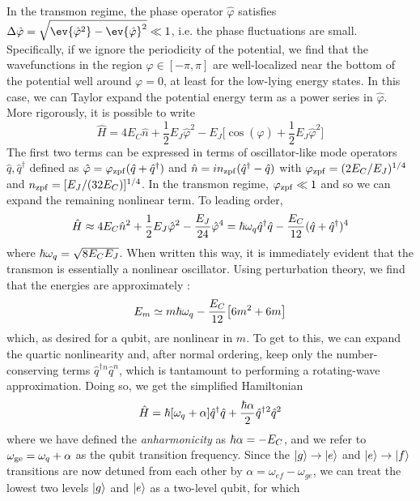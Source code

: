 In the transmon regime, the phase operator $\hat{\varphi}$ satisfies $\Delta\hat{\varphi} = \sqrt{\ev{\hat{\varphi}^2} - \ev{\hat{\varphi}}^2} \ll 1$, i.e. the phase fluctuations are small. Specifically, if we ignore the periodicity of the potential, we find that the wavefunctions in the region $\varphi \in [-\pi, \pi]$ are well-localized near the bottom of the potential well around $\varphi = 0$, at least for the low-lying energy states. In this case, we can Taylor expand the potential energy term as a power series in $\hat{\varphi}$. More rigorously, it is possible to write  
\begin{equation}
    \hat{H} = 4E_C\hat{n} + \frac{1}{2}E_J \hat{\varphi}^2 - E_J\bigg[\cos(\hat{\varphi}) + \frac{1}{2}E_J \hat{\varphi}^2\bigg]
\end{equation}
The first two terms can be expressed in terms of oscillator-like mode operators $\hat{q}, \hat{q}^\dagger$ defined as $\hat{\varphi} = \varphi_{\rm zpf}(\hat{q} + \hat{q}^\dagger)$ and $\hat{n} = in_{\rm zpf}(\hat{q}^\dagger - \hat{q})$ with $\varphi_{\rm zpf} = (2E_C/E_J)^{1/4}$ and $n_{\rm zpf} =  [E_J/(32E_C)]^{1/4}$. In the transmon regime, $\varphi_{\rm zpf} \ll 1$ and so we can expand the remaining nonlinear term. To leading order,
\begin{equation}
    \hat{H} \approx 4E_C\hat{n}^2 + \frac{1}{2}E_J \hat{\varphi}^2 - \frac{E_J}{24}\hat{\varphi}^4 = \hbar\omega_q \hat{q}^\dagger \hat{q} - \frac{E_C}{12}(\hat{q} + \hat{q}^\dagger)^4
    \label{eq:transmon_duffing_H}
\end{equation}
where $\hbar\omega_q = \sqrt{8 E_C E_J}$. When written this way, it is immediately evident that the transmon is essentially a nonlinear oscillator. Using perturbation theory, we find that the energies are approximately \cite{bishop2010circuit}:
\begin{equation}
    E_m \simeq m\hbar\omega_q - \frac{E_C}{12}\big[6m^2 + 6m\big]
\end{equation}
which, as desired for a qubit, are nonlinear in $m$. To get to this, we can expand the quartic nonlinearity and, after normal ordering, keep only the number-conserving terms $\hat{q}^\dagger{}^n\hat{q}^n$, which is tantamount to performing a rotating-wave approximation. Doing so, we get the simplified Hamiltonian
\begin{equation}
    \hat{H} = \hbar[\omega_q + \alpha]\hat{q}^\dagger \hat{q} + \frac{\hbar\alpha}{2}\hat{q}^\dagger{}^2\hat{q}^2
\end{equation}
where we have defined the \textit{anharmonicity} as $\hbar\alpha = -E_C$, and we refer to $\omega_{\rm ge} = \omega_q + \alpha$ as the qubit transition frequency. Since the $\lvert g\rangle\to\lvert e\rangle$ and $\lvert e\rangle\to\lvert f\rangle$ transitions are now detuned from each other by $\alpha = \omega_{ef}-\omega_{ge}$, we can treat the lowest two levels $\lvert g\rangle$ and $\lvert e\rangle$ as a two-level qubit, for which
